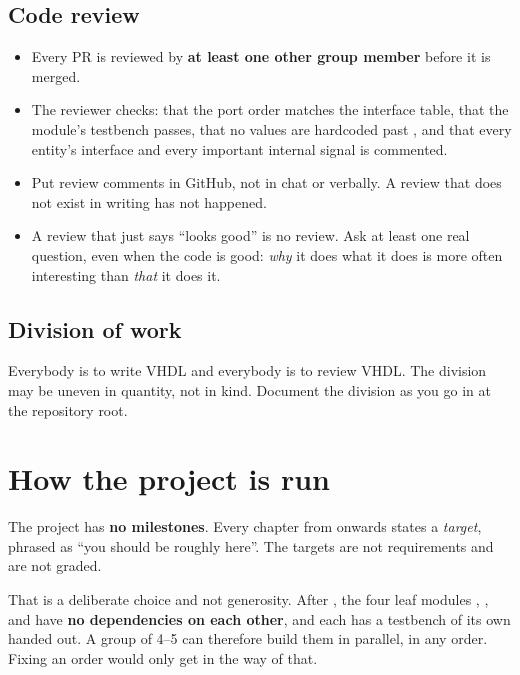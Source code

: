 \subsection{Code review}
\begin{itemize}
  \item Every PR is reviewed by \textbf{at least one other group member} before it is merged.
  \item The reviewer checks: that the port order matches the interface table, that the module's
    testbench passes, that no values are hardcoded past , and that every entity's
    interface and every important internal signal is commented.
  \item Put review comments in GitHub, not in chat or verbally. A review that does not exist in
    writing has not happened.
  \item A review that just says ``looks good'' is no review. Ask at least one real question, even
    when the code is good: \emph{why} it does what it does is more often interesting than
    \emph{that} it does it.
\end{itemize}

\subsection{Division of work}
Everybody is to write VHDL and everybody is to review VHDL. The division may be uneven in quantity,
not in kind. Document the division as you go in  at the repository root.

\section{How the project is run}
\label{app:project:drive}

The project has \textbf{no milestones}. Every chapter from  onwards states a
\emph{target}, phrased as ``you should be roughly here''. The targets are not requirements and are
not graded.

That is a deliberate choice and not generosity. After , the four leaf modules
, ,  and  have \textbf{no
dependencies on each other}, and each has a testbench of its own handed out. A group of 4--5 can
therefore build them in parallel, in any order. Fixing an order would only get in the way of that.

